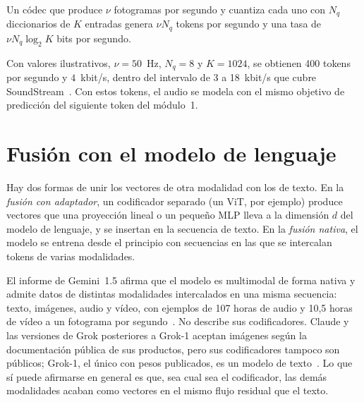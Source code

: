 \begin{proposicion}\label{prop:rvq}
Un códec que produce $\nu$ fotogramas por segundo y cuantiza cada uno con $N_q$ diccionarios de $K$ entradas genera $\nu N_q$ tokens por segundo y una tasa de $\nu N_q\log_2K$ bits por segundo.
\end{proposicion}

Con valores ilustrativos, $\nu=50$~Hz, $N_q=8$ y $K=1024$, se obtienen 400 tokens por segundo y $4$~kbit/s, dentro del intervalo de 3 a 18~kbit/s que cubre SoundStream~\cite{soundstream}. Con estos tokens, el audio se modela con el mismo objetivo de predicción del siguiente token del módulo~1.

\section{Fusión con el modelo de lenguaje}

Hay dos formas de unir los vectores de otra modalidad con los de texto. En la \emph{fusión con adaptador}, un codificador separado (un ViT, por ejemplo) produce vectores que una proyección lineal o un pequeño MLP lleva a la dimensión $d$ del modelo de lenguaje, y se insertan en la secuencia de texto. En la \emph{fusión nativa}, el modelo se entrena desde el principio con secuencias en las que se intercalan tokens de varias modalidades.

\begin{observacion}
El informe de Gemini~1.5 afirma que el modelo es multimodal de forma nativa y admite datos de distintas modalidades intercalados en una misma secuencia: texto, imágenes, audio y vídeo, con ejemplos de 107 horas de audio y 10,5 horas de vídeo a un fotograma por segundo~\cite[§3.1]{gemini15}. No describe sus codificadores. Claude y las versiones de Grok posteriores a Grok-1 aceptan imágenes según la documentación pública de sus productos, pero sus codificadores tampoco son públicos; Grok-1, el único con pesos publicados, es un modelo de texto~\cite{grok1}. Lo que sí puede afirmarse en general es que, sea cual sea el codificador, las demás modalidades acaban como vectores en el mismo flujo residual que el texto.
\end{observacion}

